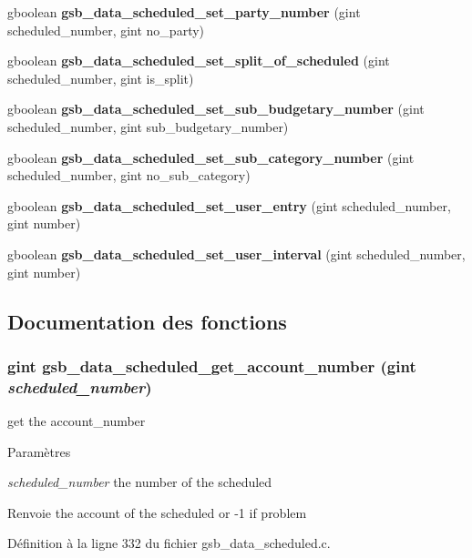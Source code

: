 \begin{DoxyCompactItemize}
gboolean {\bf gsb\_\-data\_\-scheduled\_\-set\_\-party\_\-number} (gint scheduled\_\-number, gint no\_\-party)
\item 
gboolean {\bf gsb\_\-data\_\-scheduled\_\-set\_\-split\_\-of\_\-scheduled} (gint scheduled\_\-number, gint is\_\-split)
\item 
gboolean {\bf gsb\_\-data\_\-scheduled\_\-set\_\-sub\_\-budgetary\_\-number} (gint scheduled\_\-number, gint sub\_\-budgetary\_\-number)
\item 
gboolean {\bf gsb\_\-data\_\-scheduled\_\-set\_\-sub\_\-category\_\-number} (gint scheduled\_\-number, gint no\_\-sub\_\-category)
\item 
gboolean {\bf gsb\_\-data\_\-scheduled\_\-set\_\-user\_\-entry} (gint scheduled\_\-number, gint number)
\item 
gboolean {\bf gsb\_\-data\_\-scheduled\_\-set\_\-user\_\-interval} (gint scheduled\_\-number, gint number)
\end{DoxyCompactItemize}


\subsection{Documentation des fonctions}
\subsubsection[{gsb\_\-data\_\-scheduled\_\-get\_\-account\_\-number}]{\setlength{\rightskip}{0pt plus 5cm}gint gsb\_\-data\_\-scheduled\_\-get\_\-account\_\-number (gint {\em scheduled\_\-number})}\label{gsb__data__scheduled_8h_aa15f27d9a7a635618cfc3b536cebb980}
get the account\_\-number


\begin{DoxyParams}{Paramètres}
\item[{\em scheduled\_\-number}]the number of the scheduled\end{DoxyParams}
\begin{DoxyReturn}{Renvoie}
the account of the scheduled or -\/1 if problem 
\end{DoxyReturn}


Définition à la ligne 332 du fichier gsb\_\-data\_\-scheduled.c.

